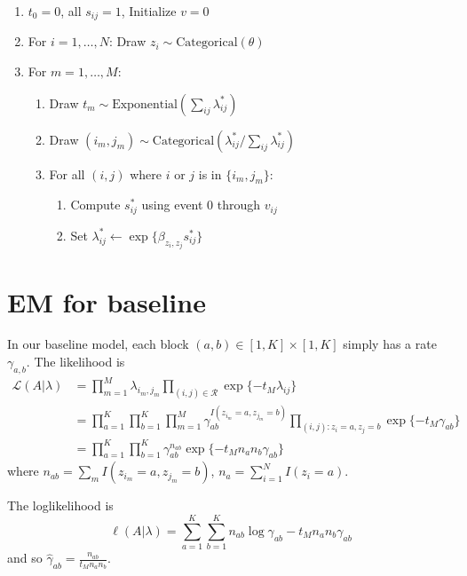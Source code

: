 \documentclass[11pt]{article}
\begin{document}
\begin{enumerate}
\item $t_0 = 0$, all $s_{ij} = 1$, Initialize $v = 0$
\item For $i = 1, \ldots, N$: Draw $z_i \sim \mbox{Categorical}(\theta)$
\item For $m = 1, \ldots, M$:
  \begin{enumerate}
  \item Draw $t_m \sim \mbox{Exponential}\left(\sum_{ij} \lambda_{ij}^*\right)$
  \item Draw $(i_m,j_m) \sim \mbox{Categorical}\left(\lambda_{ij}^* / \sum_{ij}\lambda_{ij}^*\right)$
  \item For all $(i,j)$ where $i$ or $j$ is in $\{i_m,j_m\}$:
    \begin{enumerate}
    \item Compute $s_{ij}^*$ using event $0$ through $v_{ij}$
    \item Set $\lambda_{ij}^* \leftarrow \exp\{ \beta_{z_i,z_j} s_{ij}^*\}$ 
    \end{enumerate}
  \end{enumerate}
\end{enumerate}

\section{EM for baseline}

In our baseline model, each block $(a,b) \in [1,K] \times [1,K]$ simply has a rate $\gamma_{a,b}$.
The likelihood is
\begin{align*}
\mathcal{L}(A|\lambda) &= \prod_{m=1}^M \lambda_{i_m,j_m} \prod_{(i,j) \in \mathcal{R}} \exp\{-t_M\lambda_{ij}\} \\
& =\prod_{a=1}^K \prod_{b=1}^K \prod_{m=1}^M \gamma_{ab}^{I(z_{i_m}=a,z_{j_m}=b)} \prod_{(i,j): z_i=a,z_j=b} \exp\{-t_M\gamma_{ab}\} \\
& =\prod_{a=1}^K\prod_{b=1}^K \gamma_{ab}^{n_{ab}} \exp\{-t_Mn_an_b\gamma_{ab}\}
\end{align*}
where $n_{ab} = \sum_m I(z_{i_m}=a,z_{j_m}=b)$, $n_a = \sum_{i=1}^N I(z_i=a)$.

The loglikelihood is $$\ell(A|\lambda) = \sum_{a=1}^K \sum_{b=1}^K n_{ab} \log \gamma_{ab} - t_M n_a n_b \gamma_{ab}$$
and so $\hat{\gamma}_{ab} = \frac{n_{ab}}{t_Mn_an_b}$.



\end{document}
